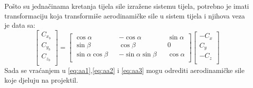 Pošto su jednačinama kretanja tijela sile izražene sistemu tijela, potrebno
je imati transformaciju koja transformiše aerodinamičke sile u sistem tijela i njihova veza je data sa:
\begin{equation}
    \begin{bmatrix}
        C_{x_b}\\
        C_{y_b}\\
        C_{z_b}\\
    \end{bmatrix}=\begin{bmatrix}
        \cos\alpha && -\cos\alpha && \sin\alpha\\
        \sin\beta &&\cos\beta && 0\\
        \sin\alpha\cos\beta && -\sin\alpha\sin\beta && \cos\alpha\\
    \end{bmatrix}\begin{bmatrix}
        -C_x\\
        C_y\\
        -C_z\\
    \end{bmatrix}
\end{equation} Sada se vraćanjem u \ref{eq:aa1},\ref{eq:aa2} i \ref{eq:aa3} mogu odrediti 
aerodinamičke sile koje djeluju na projektil. 
